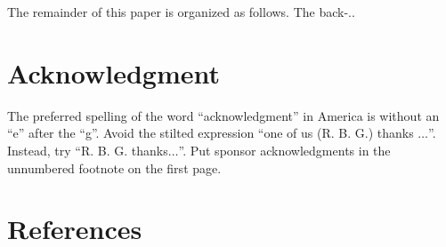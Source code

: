 \documentclass[conference]{IEEEtran}
\begin{document}
The remainder of this paper is organized as follows. The back-..









\section*{Acknowledgment}

The preferred spelling of the word ``acknowledgment'' in America is without 
an ``e'' after the ``g''. Avoid the stilted expression ``one of us (R. B. 
G.) thanks $\ldots$''. Instead, try ``R. B. G. thanks$\ldots$''. Put sponsor 
acknowledgments in the unnumbered footnote on the first page.

\section*{References}
\end{document}
